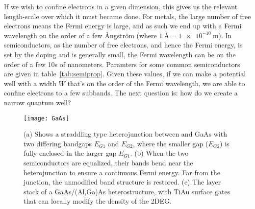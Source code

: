 If we wish to confine electrons in a given dimension, this gives us the relevant length-scale over which it must became
done. For metals, the large number of free electrons means the Fermi energy is large, and as such we end up with a
Fermi wavelength on the order of a few Ångström (where $\SI{1}{\angstrom} = \SI{1e-10}{\meter}$). In semiconductors, as 
the number of free electrons, and hence the Fermi energy, is set by the doping and is generally small, the Fermi
wavelength can be on the order of a few 10s of nanometers. Paramters for some common semiconductors are given 
in table~\ref{tab:semiprop}. Given these values, if we can make a potential well with a width $W$ that's on
the order of the Fermi wavelength, we are able to confine electrons to a few subbands. The next question is: how 
do we create a narrow quantum well?

\begin{figure}
  \texttt{[image: GaAs]}
  \caption[Band bending in a straddling type heterojunction, and the GaAs/AlGaAs heterostructure]
  {\label{fig:heterostructure}(a) Shows a straddling type heterojunction between  and GaAs with two
  differing bandgaps $E_{G1}$ and $E_{G2}$, where the smaller gap ($E_{G2}$) is fully enclosed in the larger gap $E_{G1}$.
  (b) When the two semiconductors are equalized, their bands bend near the heterojunction to ensure a continuous Fermi
  energy. Far from the junction, the unmodified band structure is restored. (c) The layer stack of a GaAs/(Al,Ga)As heterostructure,
  with TiAu surface gates that can locally modify the density of the 2DEG.}
  
\end{figure}

